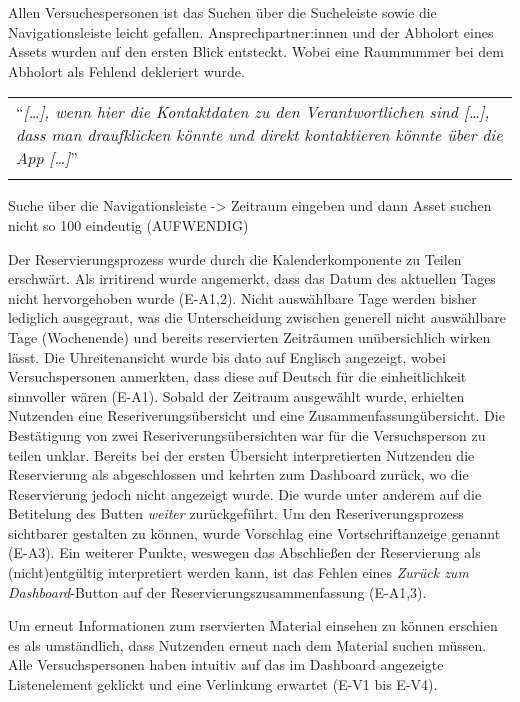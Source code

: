 Allen Versuchespersonen ist das Suchen über die Sucheleiste sowie die Navigationsleiste leicht
gefallen. Ansprechpartner:innen und der Abholort eines Assets wurden auf den ersten Blick entsteckt.
Wobei eine Raumnummer bei dem Abholort als Fehlend dekleriert wurde. 

\begin{longtable}{p{}} 
  \arrayrulecolor{maincolor}\hline
  \enquote{\textit{[\dots], wenn hier die Kontaktdaten zu den Verantwortlichen sind [\dots], dass man
    draufklicken könnte und direkt kontaktieren könnte über die App [\dots]}} \\
  \arrayrulecolor{maincolor}\hline
\end{longtable}

Suche über die Navigationsleiste -> Zeitraum eingeben und dann Asset suchen nicht so 100 eindeutig
(AUFWENDIG)

Der Reservierungsprozess wurde durch die Kalenderkomponente zu Teilen erschwärt. Als irritirend
wurde angemerkt, dass das Datum des aktuellen Tages nicht hervorgehoben wurde (E-A1,2). Nicht
auswählbare Tage werden bisher lediglich ausgegraut, was die Unterscheidung zwischen generell nicht
auswählbare Tage (Wochenende) und bereits reservierten Zeiträumen unübersichlich wirken lässt. Die
Uhreitenansicht wurde bis dato auf Englisch angezeigt, wobei Versuchspersonen anmerkten, dass diese
auf Deutsch für die einheitlichkeit sinnvoller wären (E-A1). Sobald der Zeitraum ausgewählt wurde,
erhielten Nutzenden eine Reseriverungsübersicht und eine Zusammenfassungübersicht. Die Bestätigung
von zwei Reseriverungsübersichten war für die Versuchsperson zu teilen unklar. Bereits bei der
ersten Übersicht interpretierten Nutzenden die Reservierung als abgeschlossen und kehrten zum
Dashboard zurück, wo die Reservierung jedoch nicht angezeigt wurde. Die wurde unter anderem auf die
Betitelung des Butten \textit{weiter} zurückgeführt. Um den Reseriverungsprozess sichtbarer
gestalten zu können, wurde Vorschlag eine Vortschriftanzeige genannt (E-A3). Ein weiterer Punkte,
weswegen das Abschließen der Reservierung als (nicht)entgültig interpretiert werden kann, ist das
Fehlen eines \textit{Zurück zum Dashboard}-Button auf der Reservierungszusammenfassung (E-A1,3).

Um erneut Informationen zum rservierten Material einsehen zu können erschien es als umständlich,
dass Nutzenden erneut nach dem Material suchen müssen. Alle Versuchspersonen haben intuitiv auf
das im Dashboard angezeigte Listenelement geklickt  und eine Verlinkung erwartet (E-V1 bis E-V4). 

